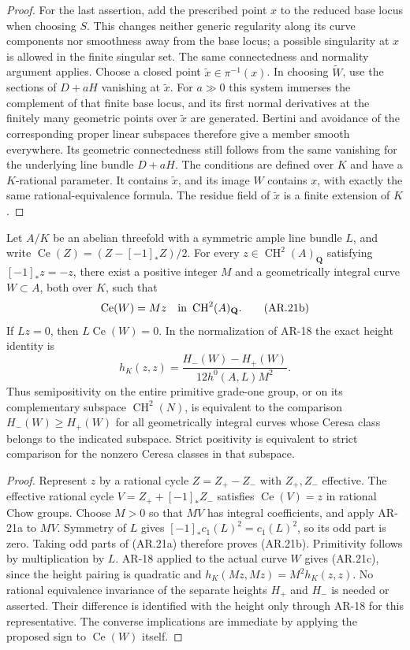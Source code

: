 \begin{proof}
For the last assertion, add the prescribed point $x$ to the reduced
base locus when choosing $S$.  This changes neither generic
regularity along its curve components nor smoothness away from the
base locus; a possible singularity at $x$ is allowed in the finite
singular set.  The same connectedness and normality argument
applies.  Choose a closed point $\widetilde x\in\pi^{-1}(x)$.
In choosing $\widetilde W$, use the sections of $D+aH$ vanishing at
$\widetilde x$.  For $a\gg0$ this system immerses the complement
of that finite base locus, and its first normal derivatives at the
finitely many geometric points over $\widetilde x$ are generated.
Bertini and avoidance of the corresponding proper linear
subspaces therefore give a member smooth everywhere.  Its
geometric connectedness still follows from the same vanishing for
the underlying line bundle $D+aH$.  The conditions are defined over
$K$ and have a $K$-rational parameter.  It contains
$\widetilde x$, and its image $W$ contains $x$, with exactly the
same rational-equivalence formula.  The residue field of
$\widetilde x$ is a finite extension of $K$.
\end{proof}

\begin{proposition}[AR-21b]
Let $A/K$ be an abelian threefold with a symmetric ample line bundle
$L$, and write
$\operatorname{Ce}(Z)=(Z-[-1]_*Z)/2$.
For every $z\in\operatorname{CH}^2(A)_{\mathbf Q}$ satisfying
$[-1]_*z=-z$, there exist a positive integer $M$ and a geometrically
integral curve $W\subset A$, both over $K$, such that
\[
 \operatorname{Ce}(W)=Mz
 \quad\hbox{in }\operatorname{CH}^2(A)_{\mathbf Q}.
 \tag{AR.21b}
\]
If $Lz=0$, then $L\operatorname{Ce}(W)=0$.  In the normalization of
AR-18 the exact height identity is
\[
 h_K(z,z)=\frac{H_-(W)-H_+(W)}{12h^0(A,L)M^2}.
 \tag{AR.21c}
\]
Thus semipositivity on the entire primitive grade-one group, or on its
complementary subspace $\operatorname{CH}^2(N)$, is equivalent to the
comparison $H_-(W)\ge H_+(W)$ for all geometrically integral curves
whose Ceresa class belongs to the indicated subspace.  Strict
positivity is equivalent to strict comparison for the nonzero Ceresa
classes in that subspace.
\end{proposition}

\begin{proof}
Represent $z$ by a rational cycle $Z=Z_+-Z_-$ with $Z_+,Z_-$ effective.
The effective rational cycle $V=Z_++[-1]_*Z_-$ satisfies
$\operatorname{Ce}(V)=z$ in rational Chow groups.  Choose $M>0$ so
that $MV$ has integral coefficients, and apply AR-21a to $MV$.
Symmetry of $L$ gives $[-1]_*c_1(L)^2=c_1(L)^2$, so its odd part is
zero.  Taking odd parts of (AR.21a) therefore proves (AR.21b).
Primitivity follows by multiplication by $L$.  AR-18 applied to the
actual curve $W$ gives (AR.21c), since the height pairing is quadratic
and $h_K(Mz,Mz)=M^2h_K(z,z)$.  No rational equivalence invariance of
the separate heights $H_+$ and $H_-$ is needed or asserted.  Their
difference is identified with the height only through AR-18 for this
representative.  The converse implications are immediate by applying
the proposed sign to $\operatorname{Ce}(W)$ itself.
\end{proof}

